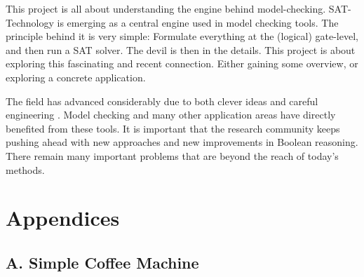 \documentclass[a4paper,10pt]{report}
\begin{document}
This project is all about understanding the engine behind model-checking. SAT-Technology is emerging as a central engine used in model checking tools. The principle behind it is very simple: Formulate everything at the (logical) gate-level, and then run a SAT solver. The devil is then in the details. This project is about exploring this fascinating and recent connection. Either gaining some overview, or exploring a concrete application.

The field has advanced considerably due to both clever ideas and careful engineering \cite{Bryant1986}. Model checking and many other application areas have directly benefited from these tools. It is important that the research community keeps pushing ahead with new approaches and new improvements in Boolean reasoning. There remain many important problems that are beyond the reach of today's methods.






\chapter{Appendices}
\label{Appendices}
\section{A. Simple Coffee Machine}
\end{document}
